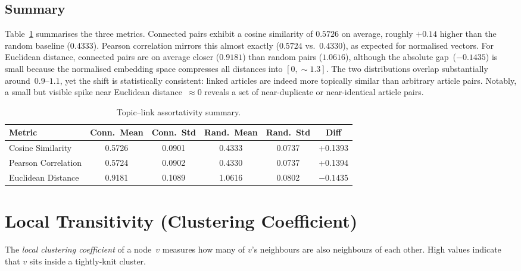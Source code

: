 \documentclass[12pt,a4paper]{article}
\begin{document}
\subsection{Summary}

Table~\ref{tab:topic_link} summarises the three metrics.
Connected pairs exhibit a cosine similarity of $0.5726$ on average, roughly $+0.14$
higher than the random baseline ($0.4333$).  Pearson correlation mirrors this almost
exactly ($0.5724$ vs.\ $0.4330$), as expected for normalised vectors.
For Euclidean distance, connected pairs are on average closer ($0.9181$) than random
pairs ($1.0616$), although the absolute gap~($-0.1435$) is small because the
normalised embedding space compresses all distances into $[0, \sim\!1.3]$.
The two distributions overlap substantially around~$0.9$--$1.1$, yet the shift is
statistically consistent: linked articles are indeed more topically similar than
arbitrary article pairs.  Notably, a small but visible spike near Euclidean
distance~$\approx 0$ reveals a set of near-duplicate or near-identical article pairs.

\begin{table}[H]
\centering
\caption{Topic--link assortativity summary.}
\label{tab:topic_link}
\begin{tabular}{lccccc}
\toprule
\textbf{Metric} & \textbf{Conn.\ Mean} & \textbf{Conn.\ Std} & \textbf{Rand.\ Mean} & \textbf{Rand.\ Std} & \textbf{Diff} \\
\midrule
Cosine Similarity   & 0.5726 & 0.0901 & 0.4333 & 0.0737 & +0.1393 \\
Pearson Correlation & 0.5724 & 0.0902 & 0.4330 & 0.0737 & +0.1394 \\
Euclidean Distance  & 0.9181 & 0.1089 & 1.0616 & 0.0802 & $-0.1435$ \\
\bottomrule
\end{tabular}
\end{table}

\section{Local Transitivity (Clustering Coefficient)}

The \emph{local clustering coefficient} of a node~$v$ measures how many of $v$'s
neighbours are also neighbours of each other.  High values indicate that $v$ sits
inside a tightly-knit cluster.
\end{document}
